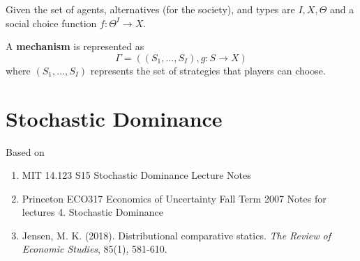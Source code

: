 \documentclass[11pt]{elegantbook}
\begin{document}
Given the set of agents, alternatives (for the society), and types are $I, X, \Theta$ and a social choice function $f:\Theta^I \rightarrow X$.

\begin{definition}[Mechanism]
    \normalfont
    A \textbf{mechanism} is represented as $$\Gamma=\left((S_1,...,S_I), g:S \rightarrow X\right)$$
    where $(S_1,...,S_I)$ represents the set of strategies that players can choose.
\end{definition}










\chapter{Stochastic Dominance}
Based on
\begin{enumerate}[$\circ$]
    \item MIT 14.123 S15 Stochastic Dominance Lecture Notes
    \item Princeton ECO317 Economics of Uncertainty Fall Term 2007 Notes for lectures 4. Stochastic Dominance
    \item Jensen, M. K. (2018). Distributional comparative statics. \textit{The Review of Economic Studies}, 85(1), 581-610.
\end{enumerate}
\end{document}
